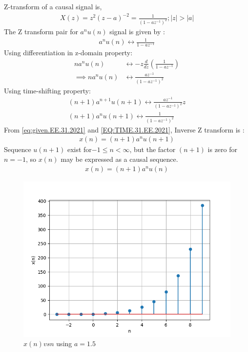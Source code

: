 \documentclass[journal,12pt,twocolumn]{IEEEtran}
\theoremstyle{remark}
\begin{document}
Z-transform of a causal signal is, 
\begin{align}
    X(z) = z^2(z - a)^{-2} = \frac{1}{(1 - az^{-1})^2};|z| > |a|\label{eq:given.EE.31.2021}
\end{align}
The Z transform pair for $a^nu(n)$ signal is given by :
\begin{align}
    a^nu(n) \longleftrightarrow \frac{1}{1 - az^{-1}}
\end{align}
Using differentiation in z-domain property:
\begin{align}
    na^nu(n) &\longleftrightarrow -z\frac{d}{dz}\left(\frac{1}{1 - az^{-1}}\right) \\
     \implies    na^nu(n) &\longleftrightarrow \frac{az^{-1}}{(1 - az^{-1})^2}
\end{align}
Using time-shifting property:
\begin{align}
  (n + 1)a^{n + 1}u(n + 1) \longleftrightarrow \frac{az^{-1}}{(1 - az^{-1})^2}z\\
  (n + 1)a^nu(n + 1) \longleftrightarrow \frac{1}{(1 - az^{-1})^2}\label{EQ:TIME.31.EE.2021}
\end{align}
From \eqref{eq:given.EE.31.2021} and \eqref{EQ:TIME.31.EE.2021}, Inverse Z transform is :
\begin{align}
    x(n) = (n + 1)a^nu(n + 1)
\end{align}
Sequence \(u(n + 1)\) exist for\(-1 \leq n < \infty\), but the factor \((n + 1)\) is zero for \(n = -1\), so \(x(n)\) may be expressed as a causal sequence. 
\begin{align}
    x(n) = (n + 1)a^nu(n)
\end{align}



\begin{figure}[htbp]
    \centering
    \includegraphics[width = \columnwidth]{2021/EE/31/figs/transform.png}
	\caption{$x(n) vs n $ using $a = 1.5$}
    \label{fig:graph1.41.IN.2022}
\end{figure}
\end{document}
